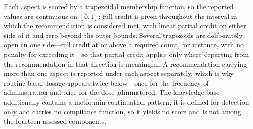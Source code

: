 \documentclass[11pt,a4paper]{article}
\begin{document}
Each aspect is scored by a trapezoidal membership function, so the reported
values are continuous on $[0,1]$: full credit is given throughout the
interval in which the recommendation is considered met, with linear partial
credit on either side of it and zero beyond the outer bounds. Several
trapezoids are deliberately open on one side---full credit at or above a
required count, for instance, with no penalty for exceeding it---so that
partial credit applies only where departing from the recommendation in that
direction is meaningful. A recommendation
carrying more than one aspect is reported under each aspect separately, which
is why routine basal dosage appears twice below---once for the frequency of
administration and once for the dose administered. The knowledge base
additionally contains a metformin continuation pattern; it is defined for
detection only and carries no compliance function, so it yields no score and
is not among the fourteen assessed components.
\end{document}
